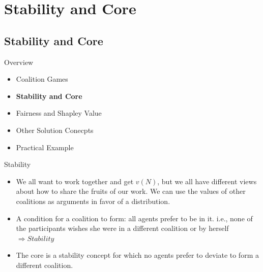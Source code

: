 \documentclass{beamer}
\begin{document}
\section{Stability and Core}
\subsection{Stability and Core}

\begin{frame}{Overview}
    \begin{itemize}
     	\itemsep=.5cm
    	\item Coalition Games
    	\item {\bf Stability and Core}
    	\item Fairness and Shapley Value
    	\item Other Solution Conecpts
        \item Practical Example
    \end{itemize}
\end{frame}

\begin{frame}{Stability}
    \begin{itemize}
        \item We all want to work together and get $v(N)$, but we all have different views about how to share the fruits of our work. We can use the values of other coalitions as arguments in favor of a distribution.
        \item A condition for a coalition to form:
            {\color{blue}all} agents prefer to be in it. i.e., none of the participants wishes she were in a different coalition or by herself {\color{blue} $\Rightarrow Stability$ }
        \item The {\color{blue} core} is a stability concept for which no agents prefer to deviate to form a different coalition.
    \end{itemize}
\end{frame}
\end{document}
